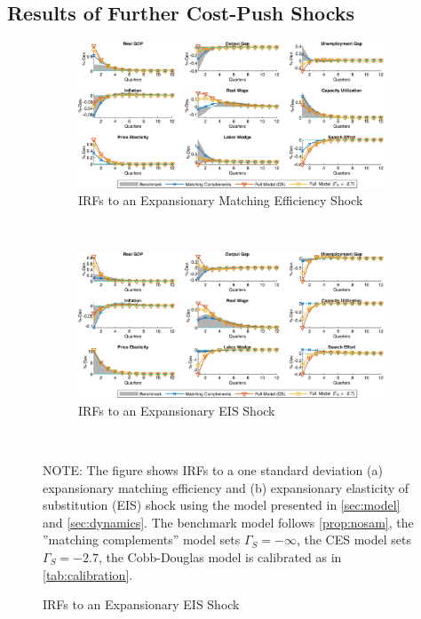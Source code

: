 \documentclass[12pt,3p,authoryear,review]{elsarticle}
\begin{document}
\subsection{Results of Further Cost-Push Shocks}\label{sec:irf_add_cost-push}%
\begin{figure}[h!]%
    \centering%
    \caption{Channel Decomposition - IRFs of Further Cost-Push Shocks}\label{fig:irf_add_cost-push}%
    \begin{subfigure}{\textwidth}%
        \centering%
        \caption{IRFs to an Expansionary Matching Efficiency Shock}%
        \includegraphics[width=\textwidth]{fig_12_irf_default_efficiency.png}%
    \end{subfigure}\\%
	\vspace{0.2in}%
    \begin{subfigure}{\textwidth}%
        \centering%
        \caption{IRFs to an Expansionary EIS Shock}%
        \includegraphics[width=\textwidth]{fig_13_irf_default_eis.png}%
    \end{subfigure}\\%
    {\tiny \singlespacing NOTE: The figure shows IRFs to a one standard deviation (a) expansionary matching efficiency and (b) expansionary elasticity of substitution (EIS) shock using the model presented in \cref{sec:model} and \cref{sec:dynamics}. The benchmark model follows \cref{prop:nosam}, the ''matching complements'' model sets $\Gamma_S = -\infty$, the CES model sets $\Gamma_S = -2.7$, the Cobb-Douglas model is calibrated as in \cref{tab:calibration}.\par}%
\end{figure}%
\FloatBarrier%
\pagebreak%
\end{document}
